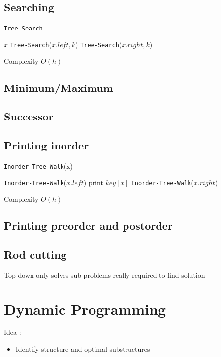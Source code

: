 \documentclass[12pt,twoside,a4paper]{article}
\begin{document}
\subsection{Searching}
\begin{algorithm}
	\caption{\texttt{Tree-Search}}
	\begin{algorithmic}
			\RETURN $x$
		\ENDIF
			\RETURN \texttt{Tree-Search}($x.left, k$)
		\ELSE
			\RETURN \texttt{Tree-Search}($x.right, k$)
		\ENDIF
	\end{algorithmic}
\end{algorithm}
\begin{boite}[0.3]
	\centering
	Complexity $O(h)$
\end{boite}

\subsection{Minimum/Maximum}
\subsection{Successor}
\subsection{Printing inorder}
\begin{algorithm}
	\caption{\texttt{Inorder-Tree-Walk}(x)}
	\begin{algorithmic}
	\IF{$x \neq NIL$}
		\STATE \texttt{Inorder-Tree-Walk}($x.left$)
		\STATE print $key[x]$
		\STATE \texttt{Inorder-Tree-Walk}($x.right$)
	\ENDIF
	\end{algorithmic}
\end{algorithm}
\begin{boite}[0.3]
	\centering
	Complexity $O(h)$
\end{boite}
\subsection{Printing preorder and postorder}
\subsection{Rod cutting}
Top down only solves sub-problems really required to find solution

\section{Dynamic Programming}
Idea : 
\begin{itemize}
	\item 	Identify structure and optimal substructures
\end{itemize}
\end{document}
